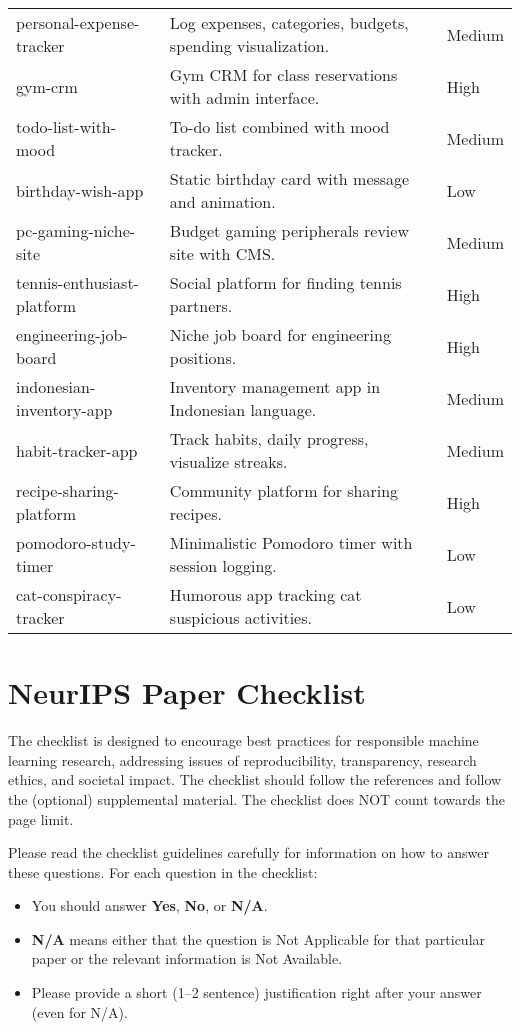 \documentclass{article}
\begin{document}
\begin{table}[h]
\begin{tabular}{p{3cm}p{8cm}p{1.5cm}}
personal-expense-tracker & Log expenses, categories, budgets, spending visualization. & Medium \\
gym-crm & Gym CRM for class reservations with admin interface. & High \\
todo-list-with-mood & To-do list combined with mood tracker. & Medium \\
birthday-wish-app & Static birthday card with message and animation. & Low \\
pc-gaming-niche-site & Budget gaming peripherals review site with CMS. & Medium \\
tennis-enthusiast-platform & Social platform for finding tennis partners. & High \\
engineering-job-board & Niche job board for engineering positions. & High \\
indonesian-inventory-app & Inventory management app in Indonesian language. & Medium \\
habit-tracker-app & Track habits, daily progress, visualize streaks. & Medium \\
recipe-sharing-platform & Community platform for sharing recipes. & High \\
pomodoro-study-timer & Minimalistic Pomodoro timer with session logging. & Low \\
cat-conspiracy-tracker & Humorous app tracking cat suspicious activities. & Low \\
\bottomrule
\end{tabular}
\end{table}


\newpage
\section*{NeurIPS Paper Checklist}

The checklist is designed to encourage best practices for responsible machine learning research, addressing issues of reproducibility, transparency, research ethics, and societal impact. The checklist should follow the references and follow the (optional) supplemental material. The checklist does NOT count towards the page limit.

Please read the checklist guidelines carefully for information on how to answer these questions. For each question in the checklist:
\begin{itemize}
    \item You should answer \textbf{Yes}, \textbf{No}, or \textbf{N/A}.
    \item \textbf{N/A} means either that the question is Not Applicable for that particular paper or the relevant information is Not Available.
    \item Please provide a short (1--2 sentence) justification right after your answer (even for N/A).
\end{itemize}
\end{document}
